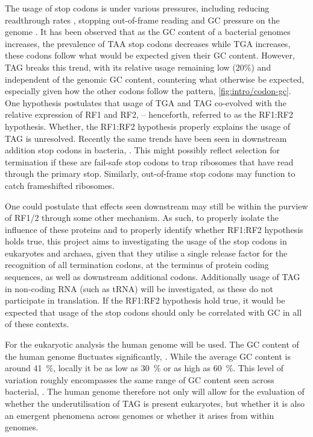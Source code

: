 \documentclass[../main.tex]{subfile}
\begin{document}
    The usage of stop codons is under various pressures, including reducing readthrough rates \autocite{Liang2005}, stopping out-of-frame reading \autocite{Tse2010} and GC pressure on the genome \autocite{Povolotskaya2012}.
    It has been observed that as the GC content of a bacterial genomes increases, the prevalence of TAA stop codons decreases while TGA increases, these codons follow what would be expected given their GC content. However, TAG breaks this trend, with its relative usage remaining low (20\%) and independent of the genomic GC content, countering what otherwise be expected, especially given how the other codons follow the pattern, \cref{fig:intro/codon-gc}.
    One hypothesis postulates that usage of TGA and TAG co-evolved with the relative expression of RF1 and RF2, \autocite{Korkmaz2014} -- henceforth, referred to as the RF1:RF2 hypothesis. Whether, the RF1:RF2 hypothesis properly explains the usage of TAG is unresolved.
    Recently the same trends have been seen in downstream addition stop codons in bacteria, \autocite{Ho2019}. This might possibly reflect selection for termination if these are fail-safe stop codons to trap ribosomes that have read through the primary stop. Similarly, out-of-frame stop codons may function to catch frameshifted ribosomes.

    One could postulate that effects seen downstream may still be within the purview of RF1/2 through some other mechanism. As such, to properly isolate the influence of these proteins and to properly identify whether RF1:RF2 hypothesis holds true, this project aims to investigating the usage of the stop codons in eukaryotes and archaea, given that they utilise a single release factor for the recognition of all termination codons, at the terminus of protein coding sequences, as well as downstream additional codons. Additionally usage of TAG in non-coding RNA (such as tRNA) will be investigated, as these do not participate in translation. If the RF1:RF2 hypothesis hold true, it would be expected that usage of the stop codons should only be correlated with GC in all of these contexts.

    For the eukaryotic analysis the human genome will be used. The GC content of the human genome fluctuates significantly, \autocite{human2001}. While the average GC content is around \SI{41}{\percent}, locally it be as low as \SI{30}{\percent} or as high as \SI{60}{\percent}. This level of variation roughly encompasses the same range of GC content seen across bacterial, \autocite{Sueoka1962}. The human genome therefore not only will allow for the evaluation of whether the underutilisation of TAG is present eukaryotes, but whether it is also an emergent phenomena across genomes or whether it arises from within genomes.
\end{document}
